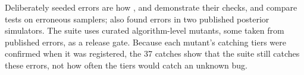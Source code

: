 Deliberately seeded errors are how \citet{geweke2004getting},
\citet[Section~3]{cook2006validation} and \citet[Section~3.1]{grosse2014testing} demonstrate their
checks, and \citet[Section~4]{gandy2021unit} compare tests on erroneous samplers;
\citeauthor{geweke2004getting} also found errors in two published posterior simulators.
The suite uses curated algorithm-level mutants, some taken from published errors, as a release
gate. Because each mutant's catching tiers were confirmed when it was registered, the 37 catches
show that the suite still catches these errors, not how often the tiers would catch an unknown bug.

